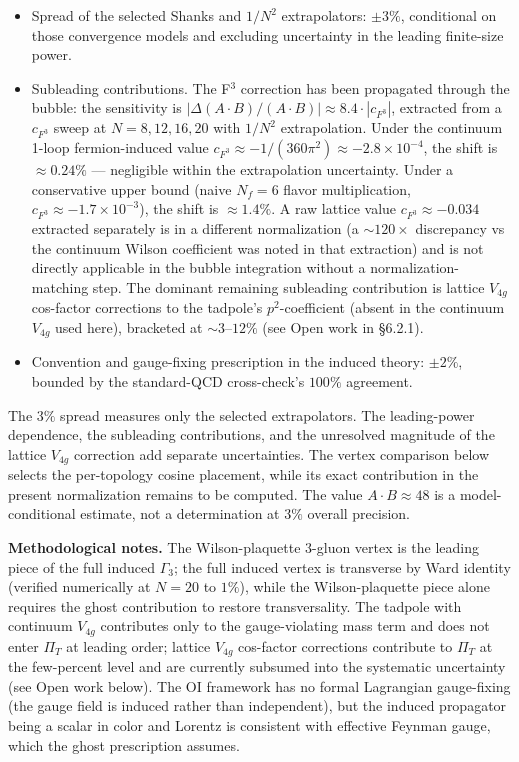 \documentclass[
]{article}
\providecommand{\tightlist}{%
  \setlength{\itemsep}{0pt}\setlength{\parskip}{0pt}}
\begin{document}
\begin{itemize}
\tightlist
\item
  Spread of the selected Shanks and \(1/N^2\) extrapolators:
  \(\pm 3\%\), conditional on those convergence models and excluding
  uncertainty in the leading finite-size power.
\item
  Subleading contributions. The F\(^3\) correction has been propagated
  through the bubble: the sensitivity is
  \(|\Delta(A \cdot B)/(A \cdot B)| \approx 8.4 \cdot |c_{F^3}|\),
  extracted from a \(c_{F^3}\) sweep at \(N = 8, 12, 16, 20\) with
  \(1/N^2\) extrapolation. Under the continuum 1-loop fermion-induced
  value \(c_{F^3} \approx -1/(360\pi^2) \approx -2.8 \times 10^{-4}\),
  the shift is \(\approx 0.24\%\) --- negligible within the
  extrapolation uncertainty. Under a conservative upper bound (naive
  \(N_f = 6\) flavor multiplication,
  \(c_{F^3} \approx -1.7 \times 10^{-3}\)), the shift is
  \(\approx 1.4\%\). A raw lattice value \(c_{F^3} \approx -0.034\)
  extracted separately is in a different normalization (a
  \(\sim 120\times\) discrepancy vs the continuum Wilson coefficient was
  noted in that extraction) and is not directly applicable in the bubble
  integration without a normalization-matching step. The dominant
  remaining subleading contribution is lattice \(V_{4g}\) cos-factor
  corrections to the tadpole's \(p^2\)-coefficient (absent in the
  continuum \(V_{4g}\) used here), bracketed at \(\sim 3\)--\(12\%\)
  (see Open work in §6.2.1).
\item
  Convention and gauge-fixing prescription in the induced theory:
  \(\pm 2\%\), bounded by the standard-QCD cross-check's \(100\%\)
  agreement.
\end{itemize}

The \(3\%\) spread measures only the selected extrapolators. The
leading-power dependence, the subleading contributions, and the
unresolved magnitude of the lattice \(V_{4g}\) correction add separate
uncertainties. The vertex comparison below selects the per-topology
cosine placement, while its exact contribution in the present
normalization remains to be computed. The value \(A \cdot B \approx 48\)
is a model-conditional estimate, not a determination at \(3\%\) overall
precision.

\textbf{Methodological notes.} The Wilson-plaquette 3-gluon vertex is
the leading piece of the full induced \(\Gamma_3\); the full induced
vertex is transverse by Ward identity (verified numerically at
\(N = 20\) to \(1\%\)), while the Wilson-plaquette piece alone requires
the ghost contribution to restore transversality. The tadpole with
continuum \(V_{4g}\) contributes only to the gauge-violating mass term
and does not enter \(\Pi_T\) at leading order; lattice \(V_{4g}\)
cos-factor corrections contribute to \(\Pi_T\) at the few-percent level
and are currently subsumed into the systematic uncertainty (see Open
work below). The OI framework has no formal Lagrangian gauge-fixing (the
gauge field is induced rather than independent), but the induced
propagator being a scalar in color and Lorentz is consistent with
effective Feynman gauge, which the ghost prescription assumes.
\end{document}
